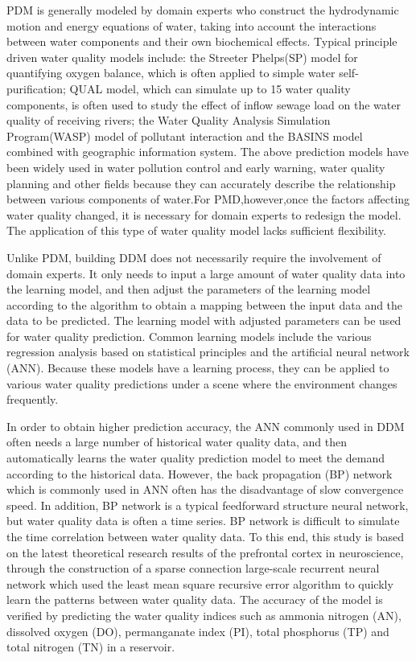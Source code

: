\documentclass[runningheads]{llncs}
\begin{document}
PDM is generally modeled by domain experts who construct 
the hydrodynamic motion and energy equations of water, 
taking into account the interactions between water components 
and their own biochemical effects\cite{RN5,RN6}.
Typical principle driven water quality models include: the Streeter Phelps(SP) 
model for quantifying oxygen balance\cite{RN7}, which is often 
applied to simple water self-purification; 
QUAL model, which can simulate up to 15 water quality components, 
is often used to study the effect of inflow sewage load on the water quality 
of receiving rivers; the Water Quality Analysis Simulation Program(WASP) 
model of pollutant interaction\cite{RN6} and the BASINS model combined with geographic 
information system\cite{RN5,RN8}. The above prediction models have been widely used 
in water pollution control and early warning, water quality planning and 
other fields because they can accurately describe the relationship between 
various components of water.For PMD,however,once the factors affecting water quality changed,
it is necessary for domain experts to redesign the model. 
The application of this type of water quality model lacks sufficient flexibility.

Unlike PDM, building DDM does not necessarily require the involvement of domain experts. 
It only needs to input a large amount of water quality data into the learning model, 
and then adjust the parameters of the learning model according to the algorithm
to obtain a mapping between the input data and the data to be predicted. 
The learning model with adjusted parameters can be used for water quality prediction.
Common learning models include the various 
regression analysis based on statistical principles\cite{RN9,RN10,RN11,RN12} and the artificial
neural network (ANN)\cite{RN13,RN14,RN15,RN16,RN17,RN18}. Because these models have a 
learning process, they can be applied to various water quality 
predictions under a scene where the environment changes frequently.

In order to obtain higher prediction accuracy, the ANN 
commonly used in DDM often needs a large number of historical 
water quality data, and then automatically learns the water 
quality prediction model to meet the demand according 
to the historical data. However, the back propagation (BP) 
network which is commonly used in ANN often has the 
disadvantage of slow convergence speed. In addition, BP network is 
a typical feedforward structure neural network, but water quality data 
is often a time series\cite{RN19}. BP network is difficult to simulate the time 
correlation between water quality data. 
To this end, this study is based on the latest theoretical research results of the prefrontal 
cortex in neuroscience\cite{RN20,RN21}, through the construction of a sparse connection 
large-scale recurrent neural network which used the least mean 
square recursive error algorithm to quickly learn the patterns between water quality data.
The accuracy of the model is verified by predicting the water quality 
indices such as ammonia nitrogen (AN), dissolved oxygen (DO), permanganate index (PI), 
total phosphorus (TP) and total nitrogen (TN) in a reservoir.
\end{document}

